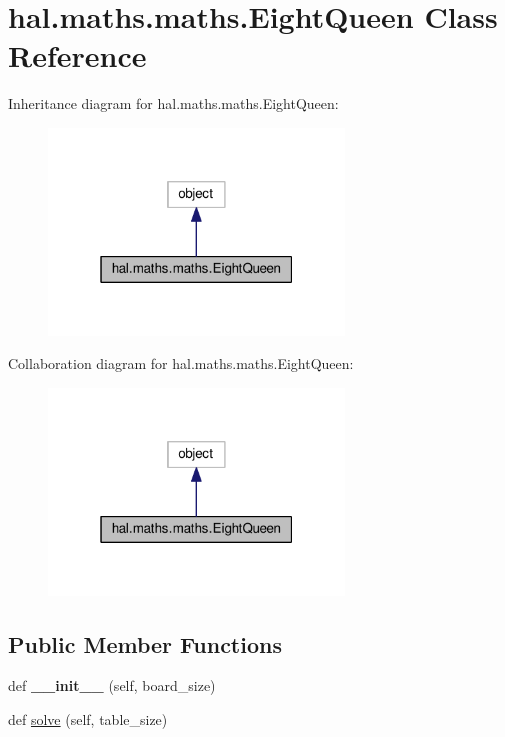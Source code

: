\hypertarget{classhal_1_1maths_1_1maths_1_1_eight_queen}{}\section{hal.\+maths.\+maths.\+Eight\+Queen Class Reference}
\label{classhal_1_1maths_1_1maths_1_1_eight_queen}


Inheritance diagram for hal.\+maths.\+maths.\+Eight\+Queen\+:\nopagebreak
\begin{figure}[H]
\begin{center}
\leavevmode
\includegraphics[width=223pt]{classhal_1_1maths_1_1maths_1_1_eight_queen__inherit__graph}
\end{center}
\end{figure}


Collaboration diagram for hal.\+maths.\+maths.\+Eight\+Queen\+:\nopagebreak
\begin{figure}[H]
\begin{center}
\leavevmode
\includegraphics[width=223pt]{classhal_1_1maths_1_1maths_1_1_eight_queen__coll__graph}
\end{center}
\end{figure}
\subsection*{Public Member Functions}
\begin{DoxyCompactItemize}
\item 
def {\bfseries \+\_\+\+\_\+init\+\_\+\+\_\+} (self, board\+\_\+size)\hypertarget{classhal_1_1maths_1_1maths_1_1_eight_queen_a71642e4346629fda32e51c647c28fa3f}{}\label{classhal_1_1maths_1_1maths_1_1_eight_queen_a71642e4346629fda32e51c647c28fa3f}

\item 
def \hyperlink{classhal_1_1maths_1_1maths_1_1_eight_queen_ac58c55f41bc0deaa00176cd17056e258}{solve} (self, table\+\_\+size)
\end{DoxyCompactItemize}
